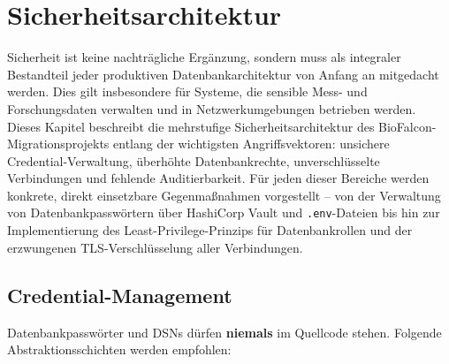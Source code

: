 \documentclass[12pt,a4paper]{report}
\theoremstyle{definition}
\theoremstyle{remark}
\newcommand{\code}[1]{\texttt{#1}}
\begin{document}
\chapter{Sicherheitsarchitektur}
\label{sec:security}

Sicherheit ist keine nachträgliche Ergänzung, sondern muss als integraler Bestandteil jeder produktiven Datenbankarchitektur von Anfang an mitgedacht werden. Dies gilt insbesondere für Systeme, die sensible Mess- und Forschungsdaten verwalten und in Netzwerkumgebungen betrieben werden. Dieses Kapitel beschreibt die mehrstufige Sicherheitsarchitektur des BioFalcon-Migrationsprojekts entlang der wichtigsten Angriffsvektoren: unsichere Credential-Verwaltung, überhöhte Datenbankrechte, unverschlüsselte Verbindungen und fehlende Auditierbarkeit. Für jeden dieser Bereiche werden konkrete, direkt einsetzbare Gegenmaßnahmen vorgestellt -- von der Verwaltung von Datenbankpasswörtern über HashiCorp Vault und \code{.env}-Dateien bis hin zur Implementierung des Least-Privilege-Prinzips für Datenbankrollen und der erzwungenen TLS-Verschlüsselung aller Verbindungen.

\section{Credential-Management}

Datenbankpassw\"orter und DSNs dürfen \textbf{niemals} im Quellcode
stehen. Folgende Abstraktionsschichten werden empfohlen:
\end{document}
